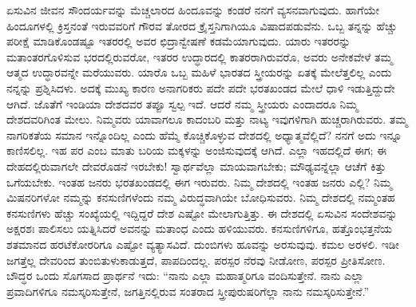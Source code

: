 ಏಸುವಿನ ಜೀವನ ಸೌಂದರ್ಯವನ್ನು ಮೆಚ್ಚಲಾರದ ಹಿಂದೂವನ್ನು ಕಂಡರೆ ನನಗೆ ವ್ಯಸನವಾಗುವುದು. ಹಾಗೆಯೇ ಹಿಂದೂಗಳಲ್ಲಿ ಕ್ರಿಸ್ತನಂತೆ ಇರುವವರಿಗೆ ಗೌರವ ತೋರದ ಕ್ರೈಸ್ತನಿಗಾಗಿಯೂ ವಿಷಾದಪಡುವೆನು. ಒಬ್ಬ ತನ್ನನ್ನು ಹೆಚ್ಚು ಪರೀಕ್ಷೆ ಮಾಡಿಕೊಂಡಷ್ಟೂ ಇತರರಲ್ಲಿ ಅವರ ಛಿದ್ರಾನ್ವೇಷಣೆ ಕಡಮೆಯಾಗುವುದು. ಯಾರು ಇತರರನ್ನು ಮತಾಂತರಗೊಳಿಸುವ ಭರದಲ್ಲಿರುವರೋ, ಇತರರ ಉದ್ಧಾರದಲ್ಲಿ ಕಾತರರಾಗಿರುವರೊ, ಅವರು ಅನೇಕವೇಳೆ ತಮ್ಮ ಆತ್ಮದ ಉದ್ಧಾರವನ್ನೇ ಮರೆಯುವರು. ಯಾರೊ ಒಬ್ಬ ಮಹಿಳೆ ಭಾರತದ ಸ್ತ್ರೀಯರನ್ನು ಏತಕ್ಕೆ ಮೇಲೆತ್ತಲಿಲ್ಲ ಎಂದು ನನ್ನನ್ನು ಪ್ರಶ್ನಿಸಿದಳು. ಅದಕ್ಕೆ ಮುಖ್ಯ ಕಾರಣ ಅನಾಗರಿಕರು ಪದೇ ಪದೇ ಭರತಖಂಡದ ಮೇಲೆ ಧಾಳಿ ಇಡುತ್ತಿದ್ದುದೇ ಆಗಿದೆ. ಜೊತೆಗೆ ಇಂಡಿಯಾ ದೇಶದವರ ತಪ್ಪೂ ಸ್ವಲ್ಪ ಇದೆ. ಆದರೆ ನಮ್ಮ ಸ್ತ್ರೀಯರು ಎಂದಾದರೂ ನಿಮ್ಮ ದೇಶದವರಿಗಿಂತ ಮೇಲು. ನಿಮ್ಮವರು ಯಾವಾಗಲೂ ಕಾದಂಬರಿ ಮತ್ತು ನಾಟ್ಯ ಇವುಗಳಿಗಾಗಿ ಹುಚ್ಚರಾಗಿರುವರು. ತಮ್ಮ ನಾಗರಿಕತೆಯ ಸಮಾನ ಇನ್ನೊಂದಿಲ್ಲ ಎಂದು ಹೆಮ್ಮೆ ಕೊಚ್ಚಿಕೊಳ್ಳುವ ದೇಶದಲ್ಲಿ ಅಧ್ಯಾತ್ಮವೆಲ್ಲಿದೆ? ನನಗೆ ಅದು ಇನ್ನೂ ಕಾಣಿಸಲಿಲ್ಲ. ಇಹ ಪರ ಎಂಬ ಮಾತು ಬರಿಯ ಮಕ್ಕಳನ್ನು ಅಂಜಿಸುವುದಕ್ಕೆ ಆಗಿದೆ. ಎಲ್ಲಾ ಇಹದಲ್ಲಿದೆ ಈಗ; ಈ ದೇಹದಲ್ಲಿರುವಾಗಲೇ ದೇವರೊಡನೆ ಇರಬೇಕು! ಸ್ವಾರ್ಥವೆಲ್ಲಾ ಮಾಯವಾಗಬೇಕು; ಮೌಢ್ಯವನ್ನೆಲ್ಲಾ ಆಚೆಗೆ ಕಿತ್ತು ಒಗೆಯಬೇಕು. ಇಂತಹ ಜನರು ಭರತಖಂಡದಲ್ಲಿ ಈಗ ಇರುವರು. ನಿಮ್ಮ ದೇಶದಲ್ಲಿ ಇಂತಹ ಜನರು ಎಲ್ಲಿ? ನಿಮ್ಮ ಮಿಷನರಿಗಳೋ ನಮ್ಮನ್ನು ಕನಸುಣಿಗಳೆಂದು ನಮ್ಮ ವಿರುದ್ಧವಾಗಿಯೇ ಬೋಧಿಸುವರು. ನಿಮ್ಮ ದೇಶದಲ್ಲಿ ನಮ್ಮಂತಹ ಕನಸುಣಿಗಳು ಹೆಚ್ಚು ಸಂಖ್ಯೆಯಲ್ಲಿ ಇದ್ದಿದ್ದರೆ ದೇಶ ಎಷ್ಟೋ ಮೇಲಾಗುತ್ತಿತ್ತು. ಈ ದೇಶದಲ್ಲಿ ಏಸುವಿನ ಸಂದೇಶವನ್ನು ಅಕ್ಷರಶಃ ಪಾಲಿಸಲು ಯತ್ನಿಸಿದರೆ ಅವನನ್ನು ಮತಾಂಧ ಎಂದು ಹಳಿಯುವರು. ಕನಸುಣಿಗಳಿಗೂ, ಹತ್ತೊಂಭತ್ತನೆಯ ಶತಮಾನದ ಹರಟೆಕೋರರಿಗೂ ಎಷ್ಟೋ ವ್ಯತ್ಯಾಸವಿದೆ. ದುಂಬಿಗಳು ಹೂವನ್ನು ಅರಸುವುವು. ಕಮಲ ಅರಳಲಿ. ಇಡೀ ಜಗತ್ತೆಲ್ಲ ದೇವರಿಂದ ತುಂಬಿತುಳುಕಾಡುತ್ತದೆ, ಪಾಪದಿಂದಲ್ಲ. ಪರಸ್ಪರ ನೆರವು ನೀಡೋಣ, ಪರಸ್ಪರ ಪ್ರೀತಿಸೋಣ. ಬೌದ್ಧರ ಒಂದು ಸೊಗಸಾದ ಪ್ರಾರ್ಥನೆ ಇದು: “ನಾನು ಎಲ್ಲಾ ಮಹಾತ್ಮರಿಗೂ ವಂದಿಸುತ್ತೇನೆ. ನಾನು ಎಲ್ಲಾ ಪ್ರವಾದಿಗಳಿಗೂ ನಮಸ್ಕರಿಸುತ್ತೇನೆ, ಜಗತ್ತಿನಲ್ಲಿರುವ ಸಂತರಾದ ಸ್ತ್ರೀಪುರುಷರಿಗೆಲ್ಲಾ ನಾನು ನಮಸ್ಕರಿಸುತ್ತೇನೆ.”

